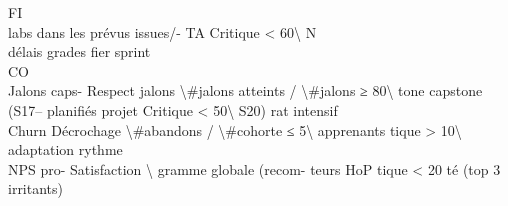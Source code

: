 \vspace{0.5em}
\vspace{0.5em}
\vspace{0.5em}
\vspace{0.5em}
FI\\
labs dans les       prévus                                         issues/-   TA        Critique \textless{} 60\textbackslash{}%
\vspace{0.5em}
\vspace{0.5em}
\vspace{0.5em}
\vspace{0.5em}
N\\
délais                                                             grades                                     fier sprint\\
\vspace{0.5em}
\vspace{0.5em}
CO\\
Jalons caps-  Respect jalons      \textbackslash{}#jalons atteints / \textbackslash{}#jalons   ≥ 80\textbackslash{}%
tone          capstone (S17–      planifiés                                      projet               Critique \textless{} 50\textbackslash{}%
S20)                                                                                                          rat intensif\\
Churn         Décrochage          \textbackslash{}#abandons / \textbackslash{}#cohorte         ≤ 5\textbackslash{}%
apprenants                                                                              tique \textgreater{} 10\textbackslash{}%
adaptation rythme\\
NPS pro-       Satisfaction       \textbackslash{}%
gramme         globale (recom-    teurs                                                     HoP       tique \textless{} 20            té (top 3 irritants)\\
